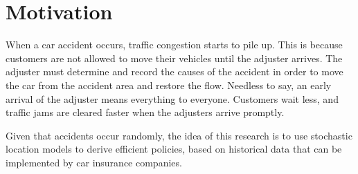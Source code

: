 \section{Motivation}
When a car accident occurs,
traffic congestion starts to pile up.
This is because
customers are not allowed
to move their vehicles until
the adjuster arrives.
The adjuster must determine and record
the causes of the accident
in order to
move the car from the accident area
and restore the flow.
Needless to say,
an early arrival of the adjuster
means everything to everyone.
Customers wait less,
and traffic jams
are cleared faster
when the adjusters arrive promptly.

Given that accidents occur randomly,
the idea of this research
is to use stochastic location models
to derive efficient policies,
based on historical data
that can be implemented
by car insurance companies.
